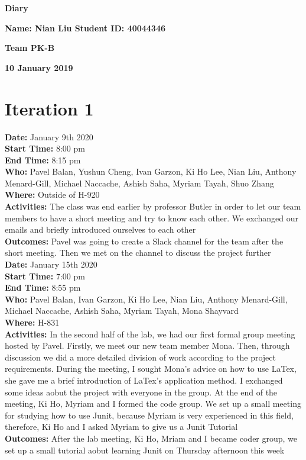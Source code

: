 \documentclass[12pt]{article}
\begin{document}
\vspace*{0.2in}
\centerline{\bf\Large Diary}

\vspace*{0.2in}
\centerline{\bf\Large Name: Nian Liu   Student ID: 40044346}

\vspace*{0.2in}
\centerline{\bf\Large Team PK-B}

\vspace*{0.2in}
\centerline{\bf\Large 10 January 2019}

\section{Iteration 1}

{\bf Date:} January 9th 2020\\
{\bf Start Time:} 8:00 pm\\
{\bf End Time:} 8:15 pm \\
{\bf Who:} Pavel Balan, Yushun Cheng, Ivan Garzon, Ki Ho Lee, Nian Liu, Anthony Menard-Gill, Michael Naccache, Ashish Saha, Myriam Tayah, Shuo Zhang\\
{\bf Where:} Outside of H-920 \\
{\bf Activities:} The class was end earlier by professor Butler in order to let our team members to have a short meeting and try to know each other. We exchanged our emails and briefly introduced ourselves to each other \\
{\bf Outcomes:} Pavel was going to create a Slack channel for the team after the short meeting. Then we met on the channel to discuss the project further\\

{\bf Date:} January 15th 2020\\
{\bf Start Time:} 7:00 pm\\
{\bf End Time:} 8:55 pm\\
{\bf Who:} Pavel Balan, Ivan Garzon, Ki Ho Lee, Nian Liu, Anthony Menard-Gill, Michael Naccache, Ashish Saha, Myriam Tayah, Mona Shayvard\\
{\bf Where:} H-831 \\
{\bf Activities:}  In the second half of the lab, we had our first formal group meeting hosted by Pavel. Firstly, we meet our new team member Mona. Then, through discussion we did a more detailed division of work according to the project requirements. During the meeting, I sought Mona's advice on how to use LaTex, she gave me a brief introduction of LaTex's application method. I exchanged some ideas aobut the project with everyone in the group. At the end of the meeting, Ki Ho, Myriam and I formed the code group. We set up a small meeting for studying how to use Junit, because Myriam is very experienced in this field, therefore, Ki Ho and I asked Myriam to give us a Junit Tutorial\\
{\bf Outcomes:} After the lab meeting, Ki Ho, Mriam and I became coder group, we set up a small tutorial aobut learning Junit on Thursday afternoon this week\\
\end{document}
